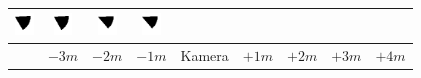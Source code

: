 \begin{tabular}{|c|c|c|c|c|c|c|c|c|}
	\includegraphics[width=0.5cm]{img_Bereich/V2_vid_Winkel_Y_1000_3000.png}&
	\includegraphics[width=0.5cm]{img_Bereich/V2_vid_Winkel_Y_2000_3000.png}&
	\includegraphics[width=0.5cm]{img_Bereich/V2_vid_Winkel_Y_3000_3000.png}&
	\includegraphics[width=0.5cm]{img_Bereich/V2_vid_Winkel_Y_4000_3000.png}\\ 
	\hline 
	& $-3m$ & $-2m$ & $-1m$ &Kamera& $+1m$ & $+2m$ & $+3m$ & $+4m$ \\ 
	\hline 
\end{tabular}